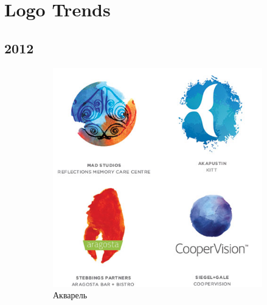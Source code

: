 \section{Logo Trends}
\label{app:logotrends}

\subsection{2012}

\begin{figure}[h!]
  \centering
  \begin{subfigure}{.45\textwidth}
    \centering
    \includegraphics[width=\linewidth]{images/supplement/logolounge/2012/Akvarel'}
    \caption{Акварель}
    \label{fig:logolounge:2012:akvarel'}
  \end{subfigure}
  \hfill
  \centering
  \begin{subfigure}{.45\textwidth}
    \centering

\end{subfigure}
\end{figure}
